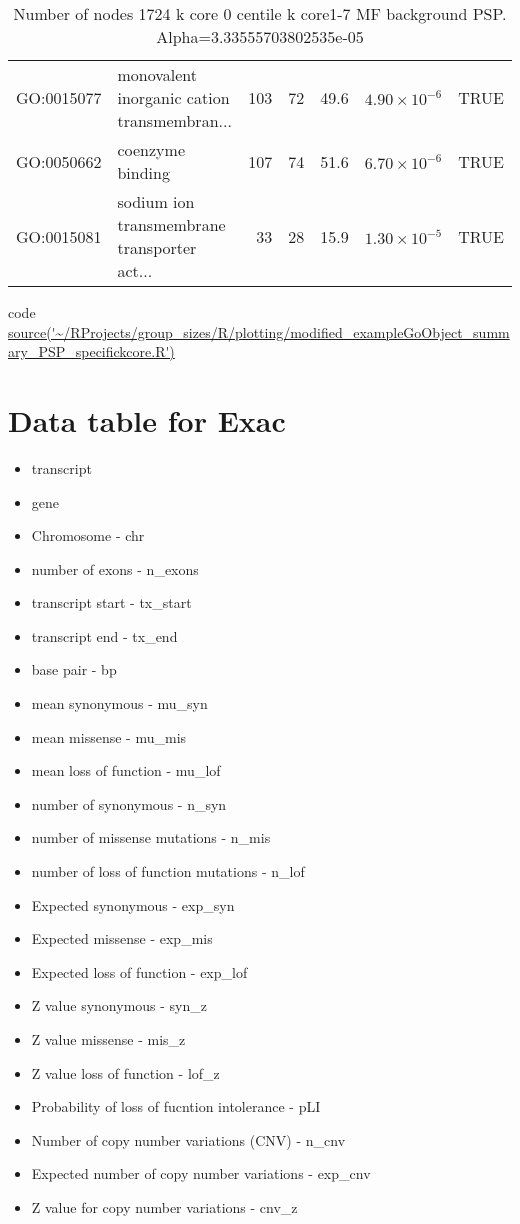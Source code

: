 \begin{table}[ht]
\begin{tabular}{llrrrrl}
  GO:0015077 & monovalent inorganic cation transmembran... & 103 & 72 & 49.6 & $4.90 \times 10^{-6}$ & TRUE \\ 
  GO:0050662 & coenzyme binding & 107 & 74 & 51.6 & $6.70 \times 10^{-6}$ & TRUE \\ 
  GO:0015081 & sodium ion transmembrane transporter act... & 33 & 28 & 15.9 & $1.30 \times 10^{-5}$ & TRUE \\ 
   \hline
\end{tabular}
\caption{Number of nodes 1724 k core 0 centile  k core1-7 MF background PSP. Alpha=3.33555703802535e-05} 
\label{tab:kcore range GO Number of nodes 1724 k core 0 centile  k core1-7 MF background PSP. Alpha=3.33555703802535e-05}
\end{table}

code \url{source('~/RProjects/group_sizes/R/plotting/modified_exampleGoObject_summary_PSP_specifickcore.R')}

\section{Data table for Exac}
\label{sec:supplemental data table for exac}
\begin{itemize}
    \item { transcript}
    \item{gene}
    \item{Chromosome - chr}
    \item{number of exons - n\_exons}
    \item{transcript start - tx\_start}
    \item{transcript end - tx\_end}
    \item{base pair - bp}
    \item{mean synonymous - mu\_syn}
    \item{mean missense - mu\_mis}
    \item{mean loss of function - mu\_lof}
    \item{number of synonymous - n\_syn}
    \item{number of missense mutations - n\_mis}
    \item{number of loss of function mutations - n\_lof}
    \item{Expected synonymous - exp\_syn}
    \item{Expected missense - exp\_mis}
    \item{Expected loss of function - exp\_lof}
    \item{Z value synonymous - syn\_z}
    \item{Z value missense - mis\_z}
    \item{Z value loss of function - lof\_z}
    \item{Probability of loss of fucntion intolerance - pLI}
    \item{Number of copy number variations (CNV) - n\_cnv}
    \item{Expected number of copy number variations - exp\_cnv}
    \item{Z value for copy number variations - cnv\_z}
    
\end{itemize}